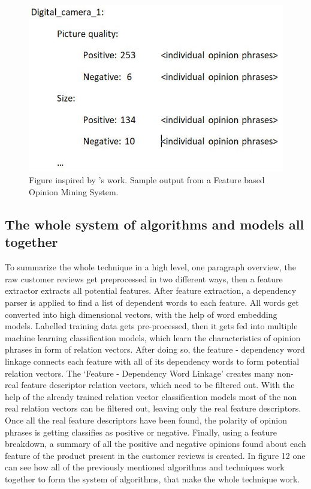 \documentclass{sig-alternate}
\begin{document}
\begin{figure}
\centering
\includegraphics[scale=0.60]{images/fbom_system.JPG}
\caption{Figure inspired by \cite{hu2004mining}'s work. Sample output from a Feature based Opinion Mining System.}
\end{figure}

\subsection{The whole system of algorithms and models all together}
To summarize the whole technique in a high level, one paragraph overview, the raw customer reviews get preprocessed in two different ways, then a feature extractor extracts all potential features. After feature extraction, a dependency parser is applied to find a list of dependent words to each feature. All words get converted into high dimensional vectors, with the help of word embedding models. Labelled training data gets pre-processed, then it gets fed into multiple machine learning classification models, which learn the characteristics of opinion phrases in form of relation vectors. After doing so, the feature - dependency word linkage connects each feature with all of its dependency words to form potential relation vectors. The `Feature - Dependency Word Linkage' creates many non-real feature descriptor relation vectors, which need to be filtered out. With the help of the already trained relation vector classification models most of the non real relation vectors can be filtered out, leaving only the real feature descriptors.  Once all the real feature descriptors have been found, the polarity of opinion phrases is getting classifies as positive or negative. Finally, using a feature breakdown, a summary of all the positive and negative opinions found about each feature of the product present in the customer reviews is created.
In figure 12 one can see how all of the previously mentioned algorithms and techniques work together to form the system of algorithms, that make the whole technique work.
\end{document}
